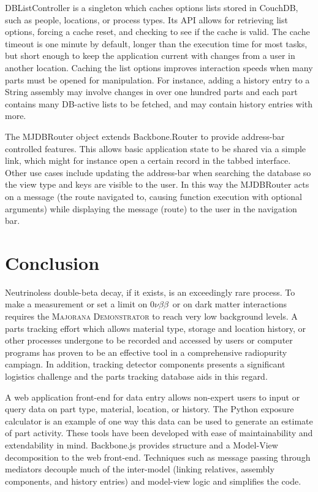 \documentclass[journal]{IEEEtran}
\def\znbb{0$\nu\beta\beta$}
\begin{document}
DBListController is a singleton which caches options lists stored in CouchDB, such as people, locations, or process types. Its
API allows for retrieving list options, forcing a cache reset, and checking to see if the cache is valid. The cache timeout is 
one minute by default, longer than the execution time for most tasks, but short enough to keep the application current
with changes from a user in another location. Caching the list options improves interaction speeds when many parts must be opened for manipulation. For
instance, adding a history entry to a String assembly may involve changes in over one hundred parts and each part contains many
DB-active lists to be fetched, and may contain history entries with more.

The MJDBRouter object extends Backbone.Router to provide address-bar controlled features. This allows basic application state
to be shared via a simple link, which might for instance open a certain record in the tabbed interface. Other use cases include
updating the address-bar when searching the database so the view type and keys are visible to the user. In this way the MJDBRouter
acts on a message (the route navigated to, causing function execution with optional arguments) while displaying the message (route)
to the user in the navigation bar.


\section{Conclusion}

Neutrinoless double-beta decay, if it exists, is an exceedingly rare process.
To make a measurement or set a limit on \znbb\ or on dark matter interactions 
requires the \textsc{Majorana Demonstrator} to reach very low background levels. A parts tracking effort which allows material type,
storage and location history, or other processes undergone to be recorded and
accessed by users or computer programs has proven to be an effective tool in a comprehensive
radiopurity campiagn. In addition, tracking detector components presents a significant
logistics challenge and the parts tracking database aids in this regard.

A web application front-end for data entry allows non-expert users to input
or query data on part type, material, location, or history. The Python exposure
calculator is an example of one way this data can be used to generate an estimate
of part activity. These tools have been developed with ease of maintainability and
extendability in mind. Backbone.js provides structure and a Model-View
decomposition to the web front-end. Techniques such as message passing through mediators
decouple much of the inter-model (linking relatives, assembly components, and history entries)
and model-view logic and simplifies the code.
\end{document}
